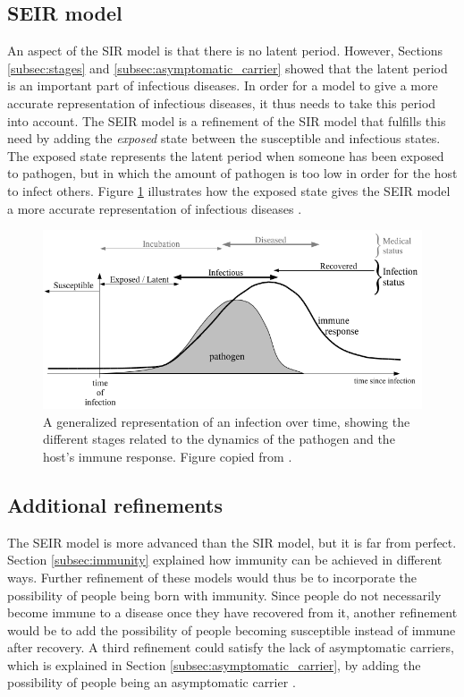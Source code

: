\subsection{SEIR model}
\label{subsec:seir_model}
An aspect of the SIR model is that there is no latent period. However, Sections \ref{subsec:stages} and \ref{subsec:asymptomatic_carrier} showed that the latent period is an important part of infectious diseases. In order for a model to give a more accurate representation of infectious diseases, it thus needs to take this period into account. The SEIR model is a refinement of the SIR model that fulfills this need by adding the \textit{exposed} state between the susceptible and infectious states. The exposed state represents the latent period when someone has been exposed to pathogen, but in which the amount of pathogen is too low in order for the host to infect others. Figure \ref{fig:seir-model} illustrates how the exposed state gives the SEIR model a more accurate representation of infectious diseases \cite{book:modelling}.

\begin{figure}[ht]
    \centering
    \includegraphics[width=\textwidth]{2 - Modelling of infectious diseases/fig/infection_timeline.png}
    \caption{A generalized representation of an infection over time, showing the different stages related to the dynamics of the pathogen and the host's immune response. Figure copied from \cite{book:modelling}.}
    \label{fig:seir-model}
\end{figure}

\subsection{Additional refinements}
The SEIR model is more advanced than the SIR model, but it is far from perfect. Section \ref{subsec:immunity} explained how immunity can be achieved in different ways. Further refinement of these models would thus be to incorporate the possibility of people being born with immunity. Since people do not necessarily become immune to a disease once they have recovered from it, another refinement would be to add the possibility of people becoming susceptible instead of immune after recovery. A third refinement could satisfy the lack of asymptomatic carriers, which is explained in Section \ref{subsec:asymptomatic_carrier}, by adding the possibility of people being an asymptomatic carrier \cite{book:modelling}.

